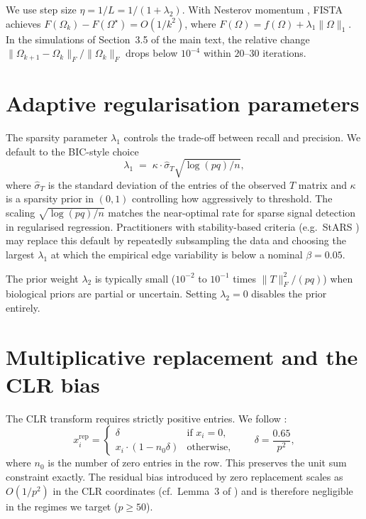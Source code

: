 \documentclass[11pt]{article}
\theoremstyle{plain}
\begin{document}
We use step size $\eta = 1/L = 1/(1 + \lambda_2)$. With Nesterov momentum
\citep{Nesterov1983,BeckTeboulle2009}, FISTA achieves
$F(\Omega_k) - F(\Omega^\star) = O(1/k^2)$, where
$F(\Omega) = f(\Omega) + \lambda_1\|\Omega\|_1$. In the simulations of
Section~3.5 of the main text, the relative change
$\|\Omega_{k+1} - \Omega_k\|_F / \|\Omega_k\|_F$ drops below $10^{-4}$
within $20$--$30$ iterations.

\section{Adaptive regularisation parameters}
\label{sec:lambda}

The sparsity parameter $\lambda_1$ controls the trade-off between recall
and precision. We default to the BIC-style choice
\begin{equation}
\lambda_1 \;=\; \kappa \cdot \hat{\sigma}_T \sqrt{\log(pq)/n},
\end{equation}
where $\hat{\sigma}_T$ is the standard deviation of the entries of the
observed $T$ matrix and $\kappa$ is a sparsity prior in $(0,1)$ controlling
how aggressively to threshold. The scaling $\sqrt{\log(pq)/n}$ matches the
near-optimal rate for sparse signal detection in regularised regression.
Practitioners with stability-based criteria (e.g.\ StARS \citep{Liu2010})
may replace this default by repeatedly subsampling the data and choosing the
largest $\lambda_1$ at which the empirical edge variability is below a
nominal $\beta = 0.05$.

The prior weight $\lambda_2$ is typically small ($10^{-2}$ to $10^{-1}$
times $\|T\|_F^2/(pq)$) when biological priors are partial or uncertain.
Setting $\lambda_2 = 0$ disables the prior entirely.

\section{Multiplicative replacement and the CLR bias}
\label{sec:zero-handling}

The CLR transform requires strictly positive entries. We follow
\cite{MartinFernandez2003}:
\begin{equation}
x_i^{\mathrm{rep}} =
\begin{cases}
\delta & \text{if } x_i = 0, \\[2pt]
x_i \cdot \left(1 - n_0 \delta\right) & \text{otherwise,}
\end{cases}
\qquad
\delta = \frac{0.65}{p^2},
\end{equation}
where $n_0$ is the number of zero entries in the row. This preserves the
unit sum constraint exactly. The residual bias introduced by zero
replacement scales as $O(1/p^2)$ in the CLR coordinates (cf.\ Lemma~3 of
\cite{Quinn2019}) and is therefore negligible in the regimes we target
($p \geq 50$).
\end{document}
